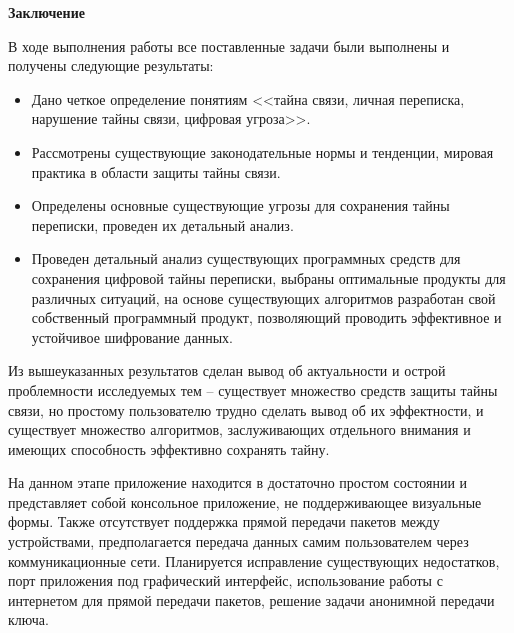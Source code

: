 \parindent=1cm %
\begin{center}
	
	\textbf{Заключение}
	
\end{center}

В ходе выполнения работы все поставленные задачи были выполнены и получены следующие результаты: 
\begin{itemize}
	\item  Дано четкое определение понятиям <<тайна связи, личная переписка, нарушение тайны связи, цифровая угроза>>.
	\item Рассмотрены существующие законодательные нормы и тенденции, мировая практика в области защиты тайны связи.
	\item Определены основные существующие угрозы для сохранения тайны переписки, проведен их детальный анализ.
	\item Проведен детальный анализ существующих программных средств для сохранения цифровой тайны переписки, выбраны оптимальные продукты для различных ситуаций, на основе существующих алгоритмов разработан свой собственный программный продукт, позволяющий проводить эффективное и устойчивое шифрование данных. 
\end{itemize}

Из  вышеуказанных результатов  сделан вывод об актуальности и острой проблемности исследуемых тем -- существует множество средств защиты тайны связи, но простому пользователю трудно сделать вывод об их эффектности, и существует множество алгоритмов, заслуживающих отдельного внимания и имеющих способность эффективно сохранять тайну.

На данном этапе приложение находится в достаточно простом состоянии и представляет собой консольное приложение, не поддерживающее визуальные формы. Также отсутствует поддержка прямой передачи пакетов между устройствами, предполагается передача данных самим пользователем через коммуникационные сети. Планируется исправление существующих недостатков, порт приложения под графический интерфейс, использование работы с интернетом для прямой передачи пакетов, решение задачи анонимной передачи ключа.	
\newpage